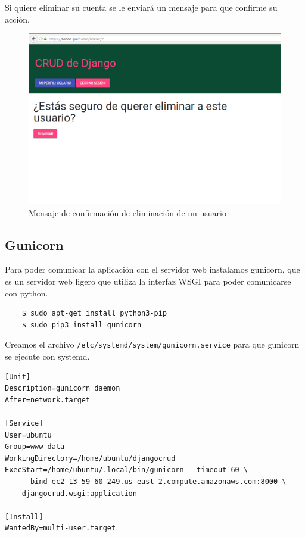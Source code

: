 \documentclass[9pt]{article}
\begin{document}
Si quiere eliminar su cuenta se le enviará un mensaje para que confirme su acción. \\
\begin{figure}[H]
  \centering
  \includegraphics[width=\textwidth]{crud/app7}
  \caption{Mensaje de confirmación de eliminación de un usuario}
\end{figure}

\subsection{Gunicorn}

Para poder comunicar la aplicación con el servidor web instalamos \textsf{gunicorn}, que es un servidor web ligero que utiliza la interfaz WSGI para poder comunicarse con \textsf{python}.
\begin{verbatim}
    $ sudo apt-get install python3-pip
    $ sudo pip3 install gunicorn
\end{verbatim}

Creamos el archivo \texttt{/etc/systemd/system/gunicorn.service} para que \textsf{gunicorn} se ejecute con \textsf{systemd}.

\begin{verbatim}
[Unit]
Description=gunicorn daemon
After=network.target

[Service]
User=ubuntu
Group=www-data
WorkingDirectory=/home/ubuntu/djangocrud
ExecStart=/home/ubuntu/.local/bin/gunicorn --timeout 60 \
    --bind ec2-13-59-60-249.us-east-2.compute.amazonaws.com:8000 \
    djangocrud.wsgi:application

[Install]
WantedBy=multi-user.target
\end{verbatim}
\end{document}
